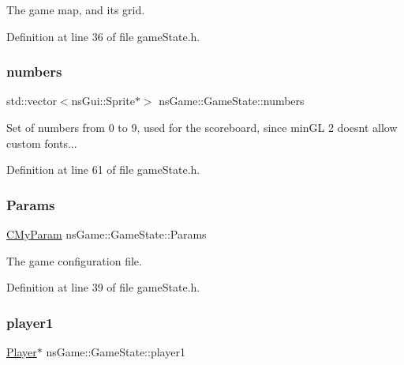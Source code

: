 The game map, and its grid. 



Definition at line 36 of file game\+State.\+h.

\mbox{\label{classns_game_1_1_game_state_a0b870e02f74c266d4a03dbe9210f7678}} 
\subsubsection{\texorpdfstring{numbers}{numbers}}
{\footnotesize\ttfamily std\+::vector$<$ns\+Gui\+::\+Sprite$\ast$$>$ ns\+Game\+::\+Game\+State\+::numbers}



Set of numbers from 0 to 9, used for the scoreboard, since min\+GL 2 doesn\textquotesingle{}t allow custom fonts... 



Definition at line 61 of file game\+State.\+h.

\mbox{\label{classns_game_1_1_game_state_a972d8482f9ed69d536ff8c7927a8c290}} 
\subsubsection{\texorpdfstring{Params}{Params}}
{\footnotesize\ttfamily \hyperlink{struct_c_my_param}{C\+My\+Param} ns\+Game\+::\+Game\+State\+::\+Params}



The game configuration file. 



Definition at line 39 of file game\+State.\+h.

\mbox{\label{classns_game_1_1_game_state_aec14e8ba226edc828deabb6e6b276c70}} 
\subsubsection{\texorpdfstring{player1}{player1}}
{\footnotesize\ttfamily \hyperlink{classns_game_1_1_player}{Player}$\ast$ ns\+Game\+::\+Game\+State\+::player1}



